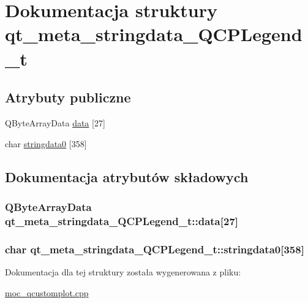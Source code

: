 \hypertarget{structqt__meta__stringdata___q_c_p_legend__t}{}\section{Dokumentacja struktury qt\+\_\+meta\+\_\+stringdata\+\_\+\+Q\+C\+P\+Legend\+\_\+t}
\label{structqt__meta__stringdata___q_c_p_legend__t}
\subsection*{Atrybuty publiczne}
\begin{DoxyCompactItemize}
\item 
Q\+Byte\+Array\+Data \hyperlink{structqt__meta__stringdata___q_c_p_legend__t_ad8e758839b2e9818ac5f23a303aa99e7}{data} \mbox{[}27\mbox{]}
\item 
char \hyperlink{structqt__meta__stringdata___q_c_p_legend__t_ad3fb75c2831542ab8fdf3b1e50696a64}{stringdata0} \mbox{[}358\mbox{]}
\end{DoxyCompactItemize}


\subsection{Dokumentacja atrybutów składowych}
\subsubsection[{\texorpdfstring{data}{data}}]{\setlength{\rightskip}{0pt plus 5cm}Q\+Byte\+Array\+Data qt\+\_\+meta\+\_\+stringdata\+\_\+\+Q\+C\+P\+Legend\+\_\+t\+::data\mbox{[}27\mbox{]}}\hypertarget{structqt__meta__stringdata___q_c_p_legend__t_ad8e758839b2e9818ac5f23a303aa99e7}{}\label{structqt__meta__stringdata___q_c_p_legend__t_ad8e758839b2e9818ac5f23a303aa99e7}
\subsubsection[{\texorpdfstring{stringdata0}{stringdata0}}]{\setlength{\rightskip}{0pt plus 5cm}char qt\+\_\+meta\+\_\+stringdata\+\_\+\+Q\+C\+P\+Legend\+\_\+t\+::stringdata0\mbox{[}358\mbox{]}}\hypertarget{structqt__meta__stringdata___q_c_p_legend__t_ad3fb75c2831542ab8fdf3b1e50696a64}{}\label{structqt__meta__stringdata___q_c_p_legend__t_ad3fb75c2831542ab8fdf3b1e50696a64}


Dokumentacja dla tej struktury została wygenerowana z pliku\+:\begin{DoxyCompactItemize}
\item 
\hyperlink{moc__qcustomplot_8cpp}{moc\+\_\+qcustomplot.\+cpp}\end{DoxyCompactItemize}

